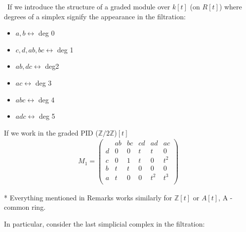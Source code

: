 \documentclass[11pt,a4paper]{report}
\begin{document}
              \
              If we introduce the structure of a graded module over $k[t]$ (on $R[t]$) where degrees of a simplex signify the appearance in the filtration:\\
              \begin{itemize}
              \item $a,b \longleftrightarrow$ deg 0
              \item $c,d,ab,bc \longleftrightarrow$ deg 1
              \item $ab, dc \longleftrightarrow$ deg2
              \item $ac \longleftrightarrow$ deg 3
              \item $abc \longleftrightarrow$ deg 4
              \item $adc \longleftrightarrow$ deg 5
              \end{itemize}
              If we work in the graded PID ($\mathbb{Z}/2\mathbb{Z}$)$[t]$\\
              \begin{align*}
                M_1 = \left(\begin{array}{c|ccccc}
                        &ab&bc&cd&ad&ac\\\hline
                        d&0&0&t&t&0\\
                        c&0&1&t&0&t^2\\
                        b&t&t&0&0&0\\
                        a&t&0&0&t^2&t^3\\
                      \end{array}\right)
              \end{align*}
              
              
              * Everything mentioned in Remarks works similarly for $\mathbb{Z}[t]$ or $A[t]$, A - common ring. 
              
              In particular, consider the last simplicial complex in the filtration:
\end{document}
